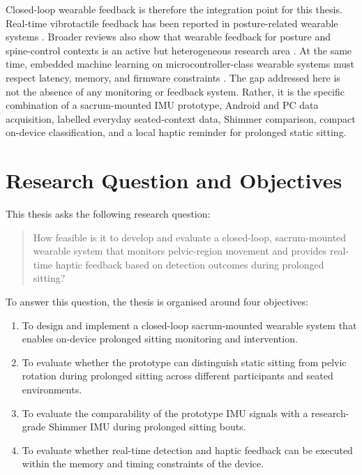 Closed-loop wearable feedback is therefore the integration point for this thesis. Real-time vibrotactile feedback has been reported in posture-related wearable systems \cite{gopalai2011vibrotactile_posture_system}. Broader reviews also show that wearable feedback for posture and spine-control contexts is an active but heterogeneous research area \cite{battis2024wearable}. At the same time, embedded machine learning on microcontroller-class wearable systems must respect latency, memory, and firmware constraints \cite{diab2022embedded}. The gap addressed here is not the absence of any monitoring or feedback system. Rather, it is the specific combination of a sacrum-mounted IMU prototype, Android and PC data acquisition, labelled everyday seated-context data, Shimmer comparison, compact on-device classification, and a local haptic reminder for prolonged static sitting.

\section{Research Question and Objectives}

This thesis asks the following research question:

\begin{quote}
How feasible is it to develop and evaluate a closed-loop, sacrum-mounted wearable system that monitors pelvic-region movement and provides real-time haptic feedback based on detection outcomes during prolonged sitting?
\end{quote}

To answer this question, the thesis is organised around four objectives:

\begin{enumerate}
    \item To design and implement a closed-loop sacrum-mounted wearable system that enables on-device prolonged sitting monitoring and intervention.
    \item To evaluate whether the prototype can distinguish static sitting from pelvic rotation during prolonged sitting across different participants and seated environments.
    \item To evaluate the comparability of the prototype IMU signals with a research-grade Shimmer IMU during prolonged sitting bouts.
    \item To evaluate whether real-time detection and haptic feedback can be executed within the memory and timing constraints of the device.
\end{enumerate}

